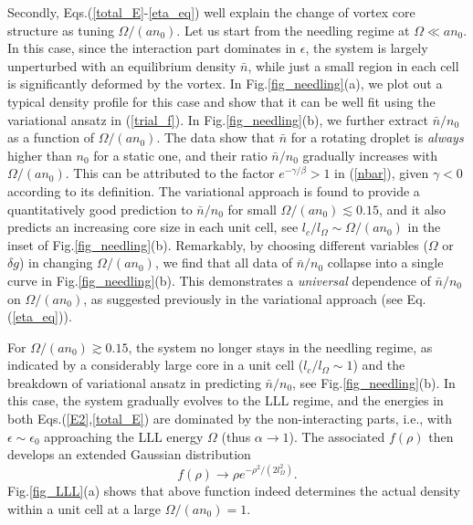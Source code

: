 \documentclass[reprint,aps,prl,twocolumn,superscriptaddress]{revtex4-1}
\begin{document}
Secondly, Eqs.(\ref{total_E}-\ref{eta_eq}) well explain the change of vortex core structure as tuning $\Omega/(an_0)$.
Let us start from the needling regime at $\Omega\ll an_0$. In this case, since the interaction part dominates in $\epsilon$, the system is largely unperturbed with an equilibrium density $\bar{n}$, while just a small region in each cell is significantly deformed by the vortex. In Fig.\ref{fig_needling}(a), we plot out a typical density profile for this case and show that it can be well fit using the variational ansatz in (\ref{trial_f}).
In Fig.\ref{fig_needling}(b), we further extract $\bar{n}/n_0$ as a function of $\Omega/(an_0)$. The data show that $\bar{n}$ for a rotating droplet is {\it always} higher than $n_0$ for a static one, and their ratio $\bar{n}/n_0$ gradually increases with $\Omega/(an_0)$. This can be attributed to the factor $e^{-\gamma/\beta}>1$ in (\ref{nbar}), given $\gamma<0$ according to its definition. The  variational approach is found to provide a quantitatively good prediction to $\bar{n}/n_0$ for small $\Omega/(an_0)\lesssim 0.15$, and it also predicts an increasing core size in each unit cell, see $l_c/l_{\Omega}\sim \Omega/(an_0)$ in the inset of Fig.\ref{fig_needling}(b). Remarkably, by choosing different variables ($\Omega$ or $\delta g$) in changing $\Omega/(an_0)$, we find that all data of $\bar{n}/n_0$ collapse into a single curve in Fig.\ref{fig_needling}(b). This demonstrates a {\it universal} dependence of $\bar{n}/n_0$ on $\Omega/(an_0)$, as suggested previously in the variational approach (see Eq.(\ref{eta_eq})). 

For $\Omega/(an_0)\gtrsim 0.15$,  the system no longer stays in the needling regime, as indicated by a considerably large core in a unit cell ($l_c/l_{\Omega}\sim 1$) and the breakdown of variational ansatz in predicting $\bar{n}/n_0$, see Fig.\ref{fig_needling}(b). In this case, the system gradually evolves to the LLL regime, and the energies in both Eqs.(\ref{E2},\ref{total_E}) are dominated by the non-interacting parts, i.e., with $\epsilon\sim \epsilon_0$ approaching the LLL energy $\Omega$ (thus $\alpha\rightarrow 1$). The associated $f(\rho)$ then develops an extended Gaussian distribution 
\begin{equation}
f(\rho)\rightarrow \rho e^{-\rho^2/(2l_{\Omega}^2)}. \label{Gaussian}
\end{equation}
Fig.\ref{fig_LLL}(a) shows that above function indeed determines the actual density within a unit cell at a large $\Omega/(an_0)=1$.
\end{document}
